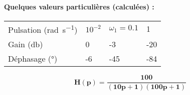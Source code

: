 \paragraph{Quelques valeurs particulières (calculées) :}
\begin{center}
\begin{tabular}{P{3.5cm}P{2cm}P{2cm}P{2cm}}
\hline
\hline
Pulsation (\si{\radian\per\second}) & $10^{-2}$ & $\omega_1=0.1$ & 1 \\[1em]
Gain (\si{\decibel})                &     0     &     -3     &   -20 \\[1em]
Déphasage (\si{\degree})            &    -6     &     -45    &   -84 \\[1em]
\hline
\hline
\end{tabular}
\end{center}
\newpage
\question{}
\[
\boldsymbol{H(p) = \dfrac{100}{(10p+1)(100p+1)}}
\]
